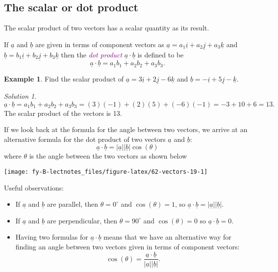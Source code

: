\documentclass[
  english,
  11pt,
  oneside]{book}
\newcommand{\slide}{}
\theoremstyle{definition}
\theoremstyle{definition}
\newtheorem{example}{Example}[chapter]
\theoremstyle{definition}
\theoremstyle{definition}
\theoremstyle{remark}
\newtheorem*{solution}{Solution}
\begin{document}
\slide

\subsection{The scalar or dot product}\label{the-scalar-or-dot-product}

The scalar product of two vectors has a scalar quantity as its result.

If \(\underline a\) and \(\underline b\) are given in terms of component vectors as \(\underline a = a_1\underline i + a_2\underline j + a_3\underline k\) and \(\underline b = b_1\underline i + b_2\underline j + b_3\underline k\) then the \textcolor{purple}{\em dot product} \(\underline{a}\cdot \underline{b}\) is defined to be
\[
\underline a \cdot\underline b = a_1b_1 + a_2b_2 + a_3b_3.
\]
\slide

\begin{example}
Find the scalar product of \(\underline a = 3\underline i + 2\underline j - 6\underline k\) and \(\underline b = -\underline i + 5\underline j - \underline k\).
\end{example}

\begin{solution}
\[
\underline a\cdot\underline b = a_1b_1 + a_2b_2 + a_3b_3 = (3)(-1)+(2)(5)+(-6)(-1) = -3+10+6=13.
\]
The scalar product of the vectors is 13.
\end{solution}

\slide

If we look back at the formula for the angle between two vectors, we arrive at an alternative formula for the dot product of two vectors \(\underline a\) and \(\underline b\):
\[
\underline a \cdot\underline b = |\underline a||\underline b|\cos(\theta)
\]
where \(\theta\) is the angle between the two vectors as shown below

\begin{center}\texttt{[image: fy-B-lectnotes\_files/figure-latex/62-vectors-19-1]} \end{center}
\slide

Useful observations:

\begin{itemize}
\item
  If \(\underline a\) and \(\underline b\) are parallel, then \(\theta = 0^\circ\) and \(\cos(\theta) = 1\), so \(\underline a \cdot\underline b = |\underline a||\underline b|\).
\item
  If \(\underline a\) and \(\underline b\) are perpendicular, then \(\theta = 90^\circ\) and \(\cos(\theta) = 0\) so \(\underline a \cdot\underline b = 0\).
\item
  Having two formulas for \(\underline{a}\cdot\underline{b}\) means that we have an alternative way for finding an angle between two vectors given in terms of component vectors:
  \begin{equation}
  \cos(\theta) = \frac{\underline a\cdot\underline b}{|\underline a||\underline b|}.
  \label{eq:11-10}
  \end{equation}
\end{itemize}
\end{document}
